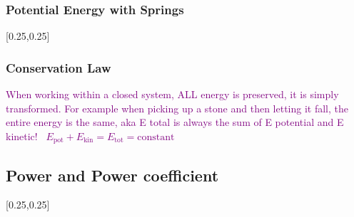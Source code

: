 \documentclass[main.tex,fontsize=8pt,paper=a4,paper=portrait,DIV=calc,]{scrartcl}
\begin{document}
\begin{multicols*}{2}
\subsubsection{Potential Energy with Springs}
[0.25,0.25]

\subsubsection{Conservation Law}
\textcolor{purple}{When working within a closed system, ALL energy is preserved, it is simply transformed.\newline
For example when picking up a stone and then letting it fall, the entire energy is the same, aka E total is always the sum of E potential and E kinetic!}\newline
\, \newline
\large \textcolor{purple}{\( E_{\text{pot}} + E_{\text{kin}} = E_{\text{tot}} = \text{constant}\)}\newline
\, \newline
\normalsize 

\subsection{Power and Power coefficient}
[0.25,0.25]


\end{multicols*}
\end{document}
